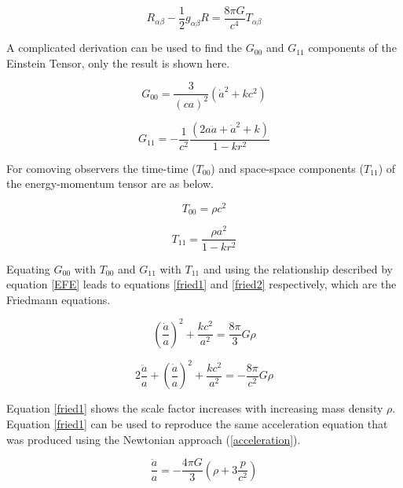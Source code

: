 \documentclass[12pt]{article} %
\begin{document}
\begin{equation}
R_{\alpha \beta} - \frac{1}{2} g_{\alpha \beta} R = \frac{8 \pi G}{c^4}T_{\alpha \beta}
\end{equation}

A complicated derivation can be used to find the $G_{00}$ and $G_{11}$ components of the Einstein Tensor, only the result is shown here.

\begin{equation}
G_{00} = \frac{3}{(ca)^2}\left(\dot a^2 +k c^2\right)
\end{equation}

\begin{equation}
G_{11} = -\frac{1}{c^2} \frac{\left(2 a \ddot a + \dot a^2 +k \right)}{1-k r^2}
\end{equation}

For comoving observers the time-time ($T_{00}$) and space-space components ($T_{11}$) of the energy-momentum tensor are as below.

\begin{equation}
T_{00} = \rho c^2
\end{equation}

\begin{equation}
T_{11} = \frac{\rho a^2}{1-k r^2}
\end{equation}

Equating $G_{00}$ with $T_{00}$ and $G_{11}$ with $T_{11}$ and using the relationship described by equation \ref{EFE} leads to equations \ref{fried1} and \ref{fried2} respectively, which are the Friedmann equations.

\begin{equation}\label{fried1}
\left(\frac{\dot a}{a}\right)^2 +\frac{k c^2}{a^2} = \frac{8 \pi}{3}G \rho
\end{equation}

\begin{equation}\label{fried2}
2\frac{\ddot a}{a} + \left(\frac{\dot a}{a}\right)^2 + \frac{k c^2}{a^2} = -\frac{8\pi}{c^2}G \rho
\end{equation}

Equation \ref{fried1} shows the scale factor increases with increasing mass density $\rho$. Equation \ref{fried1} can be used to reproduce the same acceleration equation that was produced using the Newtonian approach (\ref{acceleration}).

\begin{equation}\label{accfinal}
\frac{\ddot a}{a} =  -\frac{4\pi G}{3} \left( \rho +3\frac{p}{c^2} \right)
\end{equation}
\end{document}
